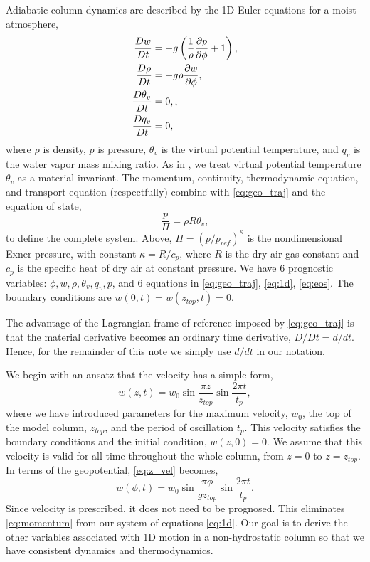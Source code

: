Adiabatic column dynamics are described by the 1D Euler equations for a moist atmosphere,
\begin{subequations}\label{eq:1d}
  \begin{align}
    \frac{D w}{Dt} &= -g\left(\frac{1}{\rho}\frac{\partial p }{\partial \phi} + 1\right), \label{eq:momentum}\\
    \frac{D \rho}{Dt} &= - g\rho \frac{\partial w }{\partial \phi}, \label{eq:continuity}\\
    \frac{D \theta_v}{Dt} &= 0, \label{eq:thermo},\\
    \frac{D q_v}{Dt} &= 0, \label{eq:qv}
  \end{align}
\end{subequations}
where $\rho$ is density, $p$ is pressure, $\theta_v$ is the virtual potential temperature, and $q_v$ is the water vapor mass mixing ratio.
As in \cite{Taylor2020}, we treat virtual potential temperature $\theta_v$ as a material invariant.
The momentum, continuity, thermodynamic equation, and transport equation (respectfully) combine with \eqref{eq:geo_traj} and the equation of state,
\begin{equation}\label{eq:eos}
  \frac{p}{\Pi} = \rho R \theta_v,
\end{equation}
to define the complete system.
Above, $\Pi = (p/p_{ref})^{\kappa}$ is the nondimensional Exner pressure, with constant $\kappa = R/c_p$, where $R$ is the dry air gas constant and $c_p$ is the specific heat of dry air at constant pressure.
We have 6 prognostic variables: $\phi, w, \rho, \theta_v, q_v, p$, and 6 equations in \eqref{eq:geo_traj}, \eqref{eq:1d}, \eqref{eq:eos}.
The boundary conditions are $w(0,t) = w(z_{top},t) = 0$.

The advantage of the Lagrangian frame of reference imposed by \eqref{eq:geo_traj} is that the material derivative becomes an ordinary time derivative, $D/Dt = d/dt$. 
Hence, for the remainder of this note we simply use $d/dt$ in our notation.

We begin with an ansatz that the velocity has a simple form,
\begin{equation}\label{eq:z_vel}
  w(z,t) = w_0\sin\frac{\pi z}{z_{top}}\sin \frac{2\pi t}{t_p},
\end{equation}
where we have introduced parameters for the maximum velocity, $w_0$, the top of the model column, $z_{top}$, and the period of oscillation $t_p$.  
This velocity satisfies the boundary conditions and the initial condition, $w(z,0) = 0$.
We assume that this velocity is valid for all time throughout the whole column, from $z=0$ to $z=z_{top}$.
In terms of the geopotential, \eqref{eq:z_vel} becomes,
\begin{equation}\label{eq:phi_vel}
  w(\phi,t) = w_0 \sin \frac{\pi \phi}{g z_{top}}\sin\frac{2\pi t}{t_p}.
\end{equation}
Since velocity is prescribed, it does not need to be prognosed. 
This eliminates \eqref{eq:momentum} from our system of equations \eqref{eq:1d}.
Our goal is to derive the other variables associated with 1D motion in a non-hydrostatic column so that we have consistent dynamics and thermodynamics.

